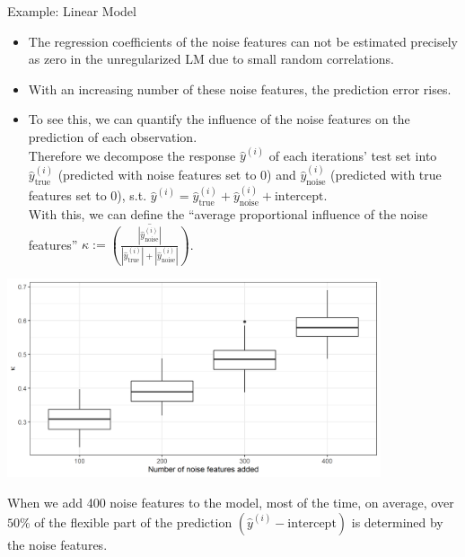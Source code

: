 \begin{vbframe}{Example: Linear Model}
\framebreak
\begin{itemize}
\item The regression coefficients of the noise features can not be estimated precisely as zero in the unregularized LM due to small random correlations. 
\item With an increasing number of these noise features, the prediction error rises.
\item To see this, we can quantify the influence of the noise features on the prediction of each observation. \\ 
Therefore we decompose the response $\hat y^{(i)}$ of each iterations' test set into $\hat y^{(i)}_{\text{true}}$ (predicted with noise features set to 0) and $\hat y^{(i)}_{\text{noise}}$ (predicted with true features set to 0), s.t. $\hat y^{(i)} =  \hat y^{(i)}_{\text{true}} + \hat y^{(i)}_{\text{noise}} + \text{intercept}$. \\
With this, we can define the \enquote{average proportional influence of the noise features} $\kappa := \overline{\left( \frac{|\hat y^{(i)}_{\text{noise}}|}{|\hat y^{(i)}_{\text{true}}| + |\hat y^{(i)}_{\text{noise}}|} \right)}$.

\end{itemize}
\framebreak

\begin{center}
\includegraphics[width = 11cm ]{figure/lm_noise_plot.png}
\end{center}

When we add 400 noise features to the model, most of the time, on average, over $50\%$ of the flexible part of the prediction $(\hat y^{(i)} - \text{intercept})$ is determined by the noise features.

\end{vbframe} 

